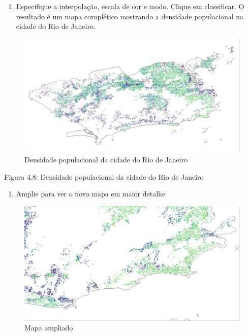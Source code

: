 \documentclass[
]{book}
\providecommand{\tightlist}{%
  \setlength{\itemsep}{0pt}\setlength{\parskip}{0pt}}
\begin{document}
\begin{enumerate}
\def\labelenumi{\arabic{enumi}.}
\setcounter{enumi}{3}
\tightlist
\item
  Especifique a interpolação, escala de cor e modo. Clique em classificar. O resultado é um mapa coroplético mostrando a densidade populacional na cidade do Rio de Janeiro.
\end{enumerate}

\begin{figure}
\centering
\includegraphics{media/modulo4/hrsl-style.png}
\caption{Densidade populacional da cidade do Rio de Janeiro}
\end{figure}

Figura 4.8: Densidade populacional da cidade do Rio de Janeiro

\begin{enumerate}
\def\labelenumi{\arabic{enumi}.}
\setcounter{enumi}{4}
\tightlist
\item
  Amplie para ver o novo mapa em maior detalhe
\end{enumerate}

\begin{figure}
\centering
\includegraphics{media/modulo4/zoom-in.png}
\caption{Mapa ampliado}
\end{figure}
\end{document}
